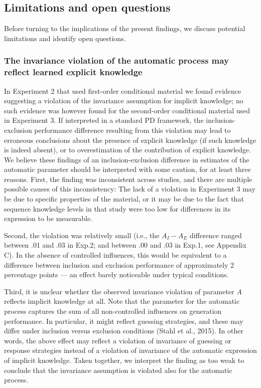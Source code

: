 \documentclass[floatsintext,doc]{apa6}
\theoremstyle{definition}
\theoremstyle{definition}
\theoremstyle{definition}
\theoremstyle{remark}
\begin{document}
\subsection{Limitations and open
questions}\label{limitations-and-open-questions}

Before turning to the implications of the present findings, we discuss
potential limitations and identify open questions.

\subsubsection{The invariance violation of the automatic process may
reflect learned explicit
knowledge}\label{the-invariance-violation-of-the-automatic-process-may-reflect-learned-explicit-knowledge}

In Experiment 2 that used first-order conditional material we found
evidence suggesting a violation of the invariance assumption for
implicit knowledge; no such evidence was however found for the
second-order conditional material used in Experiment 3. If interpreted
in a standard PD framework, the inclusion-exclusion performance
difference resulting from this violation may lead to erroneous
conclusions about the presence of explicit knowledge (if such knowledge
is indeed absent), or to overestimation of the contribution of explicit
knowledge. We believe these findings of an inclusion-exclusion
difference in estimates of the automatic parameter should be interpreted
with some caution, for at least three reasons. First, the finding was
inconsistent across studies, and there are multiple possible causes of
this inconsistency: The lack of a violation in Experiment 3 may be due
to specific properties of the material, or it may be due to the fact
that sequence knowledge levels in that study were too low for
differences in its expression to be measurable.

Second, the violation was relatively small (i.e., the \(A_{I}-A_{E}\)
difference ranged between .01 and .03 in Exp.2; and between .00 and .03
in Exp.1, see Appendix C). In the absence of controlled influences, this
would be equivalent to a difference between inclusion and exclusion
performance of approximately 2 percentage points --- an effect barely
noticeable under typical conditions.

Third, it is unclear whether the observed invariance violation of
parameter \(A\) reflects implicit knowledge at all. Note that the
parameter for the automatic process captures the sum of all
non-controlled influences on generation performance. In particular, it
might reflect guessing strategies, and these may differ under inclusion
versus exclusion conditions (Stahl et al., 2015). In other words, the
above effect may reflect a violation of invariance of guessing or
response strategies instead of a violation of invariance of the
automatic expression of implicit knowledge. Taken together, we interpret
the finding as too weak to conclude that the invariance assumption is
violated also for the automatic process.
\end{document}
